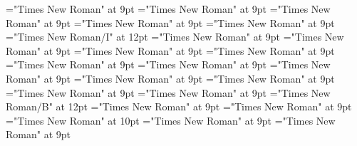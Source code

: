 \documentclass[gps1,twoside]{article}
\begin{document}
\font\reverseabbrcomplexformtypecomplexformtypescomplexformsnotsubentrycomplexformsnotsubentriesentrybefore="Times New Roman" at 9pt
\font\headwordcomplexformsnotsubentrycomplexformsnotsubentriesentrybefore="Times New Roman" at 9pt
\font\spanheadwordcomplexformsnotsubentrycomplexformsnotsubentriesentrylastchildafter="Times New Roman" at 9pt
\font\morphosyntaxanalysismorphosyntaxanalysismorphosyntaxanalysescomplexformsnotsubentrycomplexformsnotsubentriesentrybefore="Times New Roman" at 9pt
\font\morphosyntaxanalysescomplexformsnotsubentrycomplexformsnotsubentriesentryafter="Times New Roman" at 9pt
\font\morphosyntaxanalysismorphosyntaxanalysescomplexformsnotsubentrycomplexformsnotsubentriesentry="Times New Roman/I" at 12pt
\font\partofspeechmorphosyntaxanalysismorphosyntaxanalysescomplexformsnotsubentrycomplexformsnotsubentriesentrybefore="Times New Roman" at 9pt
\font\spanpartofspeechmorphosyntaxanalysismorphosyntaxanalysescomplexformsnotsubentrycomplexformsnotsubentriesentrylastchildafter="Times New Roman" at 9pt
\font\slotsmorphosyntaxanalysismorphosyntaxanalysescomplexformsnotsubentrycomplexformsnotsubentriesentrybefore="Times New Roman" at 9pt
\font\nameslotslotsmorphosyntaxanalysismorphosyntaxanalysescomplexformsnotsubentrycomplexformsnotsubentriesentrybefore="Times New Roman" at 9pt
\font\spannameslotslotsmorphosyntaxanalysismorphosyntaxanalysescomplexformsnotsubentrycomplexformsnotsubentriesentrylastchildafter="Times New Roman" at 9pt
\font\owningentrysummarydefinitioncomplexformsnotsubentrycomplexformsnotsubentriesentrybefore="Times New Roman" at 9pt
\font\spanowningentrysummarydefinitioncomplexformsnotsubentrycomplexformsnotsubentriesentryfirstchildbefore="Times New Roman" at 9pt
\font\spanowningentrysummarydefinitioncomplexformsnotsubentrycomplexformsnotsubentriesentrylastchildafter="Times New Roman" at 9pt
\font\nontrivialentryrootnontrivialentryrootnontrivialentryrootscomplexformsnotsubentrycomplexformsnotsubentriesentrybefore="Times New Roman" at 9pt
\font\nontrivialentryrootscomplexformsnotsubentrycomplexformsnotsubentriesentrybefore="Times New Roman" at 9pt
\font\nontrivialentryrootscomplexformsnotsubentrycomplexformsnotsubentriesentryafter="Times New Roman" at 9pt
\font\nontrivialentryrootnontrivialentryrootscomplexformsnotsubentrycomplexformsnotsubentriesentry="Times New Roman/B" at 12pt
\font\picturesentrybefore="Times New Roman" at 9pt
\font\picturesentryafter="Times New Roman" at 9pt
\font\picturepicturesentry="Times New Roman" at 10pt
\font\picturepicturesentryafter="Times New Roman" at 9pt
\font\captionpicturepicturesentrybefore="Times New Roman" at 9pt
\end{document}
